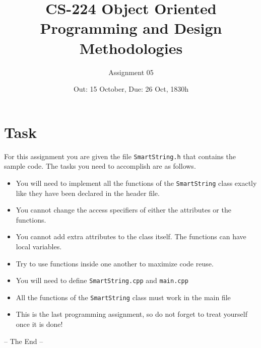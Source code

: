 \documentclass[a4paper,12pt]{article}
\title{CS-224 Object Oriented Programming and Design Methodologies }
\author{Assignment 05}
\date{Out: 15 October, Due: 26 Oct, 1830h}
\begin{document}
\maketitle

\thispagestyle{empty}

\section{Task}
For this assignment you are given the file {\tt SmartString.h} that contains the sample code. The tasks you need to accomplish are as follows.

\begin{itemize}
\item You will need to implement all the functions of the {\tt SmartString} class exactly like they have been declared in the header file.
\item  You cannot change the access specifiers of either the attributes or the functions.
\item You cannot add extra attributes to the class itself. The functions can have local variables.
\item Try to use functions inside one another to maximize code reuse.
\item You will need to define {\tt SmartString.cpp} and {\tt main.cpp}
\item All the functions of the {\tt SmartString} class must work in the main file
\item This is the last programming assignment, so do not forget to treat yourself once it is done!
\end{itemize}

\begin{center}
  -- The End --
\end{center}
\end{document}
